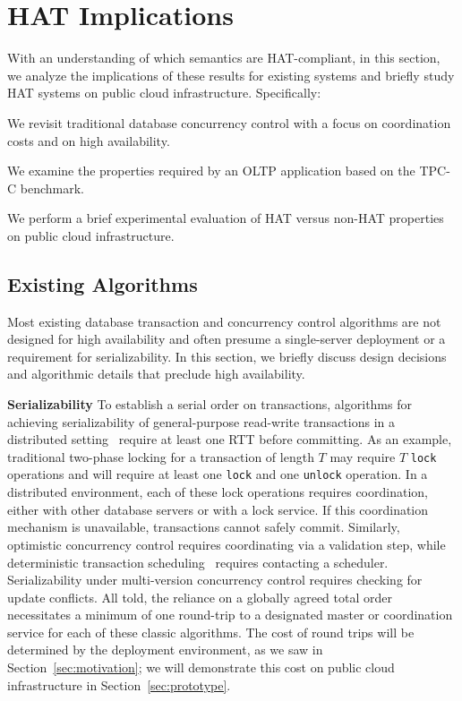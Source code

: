 
\section{HAT Implications}
\label{sec:evaluation}

With an understanding of which semantics are HAT-compliant, in this
section, we analyze the implications of these results for existing
systems and briefly study HAT systems on public cloud
infrastructure. Specifically:

\begin{myenumerate}\vspace{-.5em}
\item We revisit traditional database concurrency control with a focus
  on coordination costs and on high availability.
\item We examine the properties required by an OLTP application based
  on the TPC-C benchmark.
\item We perform a brief experimental evaluation of HAT versus non-HAT
  properties on public cloud infrastructure.
\end{myenumerate}

\subsection{Existing Algorithms}
\label{sec:eval-existing}

Most existing database transaction and concurrency control algorithms
are not designed for high availability and often presume a
single-server deployment or a requirement for serializability. In this
section, we briefly discuss design decisions and algorithmic details
that preclude high availability.

\vspace{.5em}\noindent\textbf{Serializability} To establish a serial
order on transactions, algorithms for achieving serializability of
general-purpose read-write transactions in a distributed
setting~\cite{bernstein-book, davidson-survey, wisemann-survey}
require at least one RTT before committing. As an
example, traditional two-phase locking for a transaction of length $T$
may require $T$ \texttt{lock} operations and will require at least one
\texttt{lock} and one \texttt{unlock} operation.  In a distributed
environment, each of these lock operations requires coordination,
either with other database servers or with a lock service. If this
coordination mechanism is unavailable, transactions cannot safely
commit. Similarly, optimistic concurrency control requires
coordinating via a validation step, while deterministic transaction
scheduling~\cite{deterministic-scheduling} requires contacting a
scheduler. Serializability under multi-version concurrency control
requires checking for update conflicts. All told, the reliance on a
globally agreed total order necessitates a minimum of one round-trip
to a designated master or coordination service for each of these
classic algorithms.  The cost of round trips will be determined by the
deployment environment, as we saw in Section~\ref{sec:motivation}; we
will demonstrate this cost on public cloud infrastructure in
Section~\ref{sec:prototype}.

